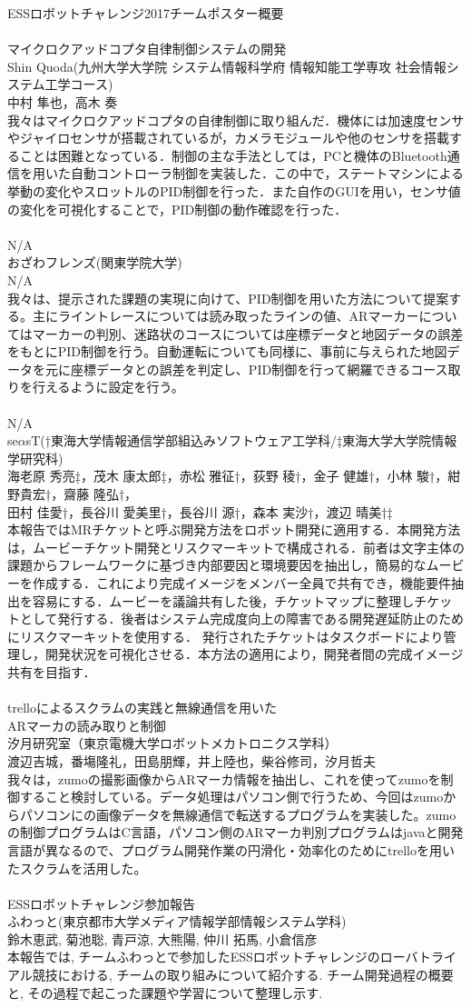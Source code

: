 \documentclass[xelatex,a4paper,ja=standard,jafont=hiragino-pron]{bxjsarticle}
\newcommand*{\team}[4]{\hrulefill\\{\Large #1}\vspace{0.5em}\\{#2}\\{#3}\vspace{0.5em}\\{#4}\vspace{1em}\\}
\begin{document}
{\huge \centering ESSロボットチャレンジ2017チームポスター概要}\\
%
\team{マイクロクアッドコプタ自律制御システムの開発}{Shin Quoda(九州大学大学院 システム情報科学府 情報知能工学専攻 社会情報システム工学コース)}{中村 隼也，高木 奏}{我々はマイクロクアッドコプタの自律制御に取り組んだ．機体には加速度センサやジャイロセンサが搭載されているが，カメラモジュールや他のセンサを搭載することは困難となっている．制御の主な手法としては，PCと機体のBluetooth通信を用いた自動コントローラ制御を実装した．この中で，ステートマシンによる挙動の変化やスロットルのPID制御を行った．また自作のGUIを用い，センサ値の変化を可視化することで，PID制御の動作確認を行った．}    
%
\team{N/A}{おざわフレンズ(関東学院大学)}{N/A}{我々は、提示された課題の実現に向けて、PID制御を用いた方法について提案する。主にライントレースについては読み取ったラインの値、ARマーカーについてはマーカーの判別、迷路状のコースについては座標データと地図データの誤差をもとにPID制御を行う。自動運転についても同様に、事前に与えられた地図データを元に座標データとの誤差を判定し、PID制御を行って網羅できるコース取りを行えるように設定を行う。}
%
\team{N/A}{se$\alpha$sT(†東海大学情報通信学部組込みソフトウェア工学科/‡東海大学大学院情報学研究科)}{海老原 秀亮‡，茂木 康太郎‡，赤松 雅征†，荻野 稜†，金子 健雄†，小林 駿†，紺野貴宏†，齋藤 隆弘†，\\田村 佳愛†，長谷川 愛美里†，長谷川 源†，森本 実沙†，渡辺 晴美†‡}{本報告ではMRチケットと呼ぶ開発方法をロボット開発に適用する．本開発方法は，ムービーチケット開発とリスクマーキットで構成される．前者は文字主体の課題からフレームワークに基づき内部要因と環境要因を抽出し，簡易的なムービーを作成する．これにより完成イメージをメンバー全員で共有でき，機能要件抽出を容易にする．ムービーを議論共有した後，チケットマップに整理しチケットとして発行する．後者はシステム完成度向上の障害である開発遅延防止のためにリスクマーキットを使用する． 発行されたチケットはタスクボードにより管理し，開発状況を可視化させる．本方法の適用により，開発者間の完成イメージ共有を目指す．}
%
\newpage\team{trelloによるスクラムの実践と無線通信を用いた\\ARマーカの読み取りと制御}{汐月研究室（東京電機大学ロボットメカトロニクス学科）}{渡辺吉城，番塲隆礼，田島朋輝，井上陸也，柴谷修司，汐月哲夫}{我々は，zumoの撮影画像からARマーカ情報を抽出し、これを使ってzumoを制御すること検討している。データ処理はパソコン側で行うため、今回はzumoからパソコンにの画像データを無線通信で転送するプログラムを実装した。zumoの制御プログラムはC言語，パソコン側のARマーカ判別プログラムはjavaと開発言語が異なるので、プログラム開発作業の円滑化・効率化のためにtrelloを用いたスクラムを活用した。}
%
\team{ESSロボットチャレンジ参加報告}{ふわっと(東京都市大学メディア情報学部情報システム学科)}{鈴木恵武, 菊池聡, 青戸涼, 大熊陽, 仲川 拓馬, 小倉信彦}{本報告では, チームふわっとで参加したESSロボットチャレンジのローバトライアル競技における, チームの取り組みについて紹介する. チーム開発過程の概要と, その過程で起こった課題や学習について整理し示す.}
\end{document}
